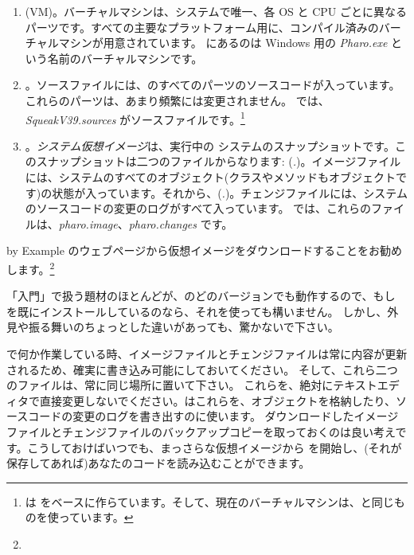 \documentclass[a4paper,10pt,twoside]{book}
\begin{document}
\begin{enumerate}

  \item {} (VM)。バーチャルマシンは、システムで唯一、各 OS と CPU ごとに異なるパーツです。すべての主要なプラットフォーム用に、コンパイル済みのバーチャルマシンが用意されています。 にあるのは Windows 用の \textit{Pharo.exe} という名前のバーチャルマシンです。

  \item {}。ソースファイルには、\pharo のすべてのパーツのソースコードが入っています。これらのパーツは、あまり頻繁には変更されません。 では、\emph{SqueakV39.sources} がソースファイルです。\footnote{\pharo は  をベースに作らています。そして、現在のバーチャルマシンは、\squeak と同じものを使っています。}

  \item {}。\emph{システム仮想イメージ}は、実行中の \pharo システムのスナップショットです。このスナップショットは二つのファイルからなります: (\emph{.})。イメージファイルには、システムのすべてのオブジェクト(クラスやメソッドもオブジェクトです)の状態が入っています。それから、(\emph{.})。チェンジファイルには、システムのソースコードの変更のログがすべて入っています。
 では、これらのファイルは、\emph{pharo.image}、\emph{pharo.changes} です。
\end{enumerate}

\pharo by Example のウェブページから仮想イメージをダウンロードすることをお勧めします。\footnote{\pbe}

「入門」で扱う題材のほとんどが、\pharo のどのバージョンでも動作するので、もし \pharo を既にインストールしているのなら、それを使っても構いません。
しかし、外見や振る舞いのちょっとした違いがあっても、驚かないで下さい。

\pharo で何か作業している時、イメージファイルとチェンジファイルは常に内容が更新されるため、確実に書き込み可能にしておいてください。
そして、これら二つのファイルは、常に同じ場所に置いて下さい。
これらを、絶対にテキストエディタで直接変更しないでください。\pharo はこれらを、オブジェクトを格納したり、ソースコードの変更のログを書き出すのに使います。
ダウンロードしたイメージファイルとチェンジファイルのバックアップコピーを取っておくのは良い考えです。こうしておけばいつでも、まっさらな仮想イメージから \pharo を開始し、(それが保存してあれば)あなたのコードを読み込むことができます。
\end{document}

